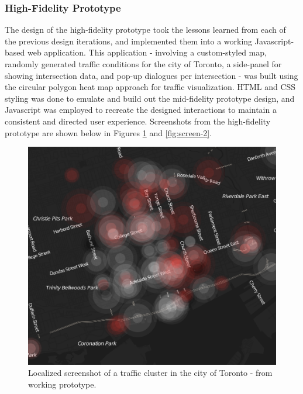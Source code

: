 \documentclass{article}
\begin{document}
\subsubsection{High-Fidelity Prototype}

The design of the high-fidelity prototype took the lessons learned from each of the previous design iterations, and implemented them into a working Javascript-based web application.
This application - involving a custom-styled map, randomly generated traffic conditions for the city of Toronto, a side-panel for showing intersection data, and pop-up dialogues per intersection - was built using the circular polygon heat map approach for traffic visualization.
HTML and CSS styling was done to emulate and build out the mid-fidelity prototype design, and Javascript was employed to recreate the designed interactions to maintain a consistent and directed user experience. Screenshots from the high-fidelity prototype are shown below in Figures \ref{fig:screen-1} and \ref{fig:screen-2}. \\

\begin{figure}[htbp!]
  \begin{centering}
    \includegraphics[scale=0.5]{figures/screen-2.png}
    \caption{Localized screenshot of a traffic cluster in the city of Toronto - from working prototype.}
    \label{fig:screen-1}
  \end{centering}
\end{figure}
\end{document}
